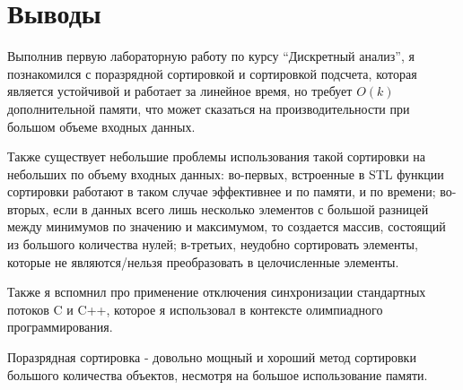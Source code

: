  
\section{Выводы}
Выполнив первую лабораторную работу по курсу \enquote{Дискретный анализ}, я познакомился с поразрядной сортировкой и сортировкой подсчета, которая является устойчивой и работает за линейное время, но требует $O(k)$ дополнительной памяти, что может сказаться на производительности при большом объеме входных данных. 

Также существует небольшие проблемы использования такой сортировки на небольших по объему входных данных: во-первых, встроенные в STL функции сортировки работают в таком случае эффективнее и по памяти, и по времени; во-вторых, если в данных всего лишь несколько элементов с большой разницей между минимумов по значению и максимумом, то создается массив, состоящий из большого количества нулей; в-третьих, неудобно сортировать элементы, которые не являются/нельзя преобразовать в целочисленные элементы.

Также я вспомнил про применение отключения синхронизации стандартных потоков C и C++, которое я использовал в контексте олимпиадного программирования.

Поразрядная сортировка - довольно мощный и хороший метод сортировки большого количества объектов, несмотря на большое использование памяти.
\pagebreak